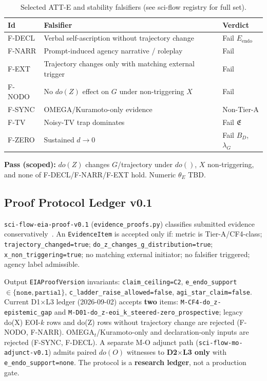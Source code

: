 \documentclass[11pt,a4paper]{article}
\theoremstyle{definition}
\begin{document}
\begin{table}[H]
\centering\small
\begin{tabular}{llp{5.5cm}}
\toprule Id & Falsifier & Verdict \\ \midrule
F-DECL & Verbal self-ascription without trajectory change & Fail $E_{\mathrm{endo}}$ \\
F-NARR & Prompt-induced agency narrative / roleplay & Fail \\
F-EXT & Trajectory changes only with matching external trigger & Fail \\
F-NODO & No $do(Z)$ effect on $G$ under non-triggering $X$ & Fail \\
F-SYNC & OMEGA/Kuramoto-only evidence & Non-Tier-A \\
F-TV & Noisy-TV trap dominates & Fail $\mathfrak{E}$ \\
F-ZERO & Sustained $d\to 0$ & Fail $B_D$, $\lambda_G$ \\ \bottomrule
\end{tabular}
\caption{Selected ATT-E and stability falsifiers (see sci-flow registry for full set).}
\end{table}

\textbf{Pass (scoped):} $do(Z)$ changes $G$/trajectory under $do()$, $X$ non-triggering, and none of F-DECL/F-NARR/F-EXT hold. Numeric $\theta_E$ TBD.

\subsection{Proof Protocol Ledger v0.1}
\texttt{sci-flow-eia-proof-v0.1} (\texttt{evidence\_proofs.py}) classifies submitted evidence conservatively~\cite{kuznetsov2026proof}. An \texttt{EvidenceItem} is accepted only if: metric is Tier-A/CF4-class; \texttt{trajectory\_changed=true}; \texttt{do\_z\_changes\_g\_distribution=true}; \texttt{x\_non\_triggering=true}; no matching external initiator; no falsifier triggered; agency label admissible.

Output \texttt{EIAProofVersion} invariants: \texttt{claim\_ceiling=C2}, \texttt{e\_endo\_support}$\in\{\texttt{none},\texttt{partial}\}$, \texttt{c\_ladder\_raise\_allowed=false}, \texttt{agi\_star\_claim=false}. Current D1$\times$L3 ledger (2026-09-02) accepts \textbf{two} items: \texttt{M-CF4-do\_z-epistemic\_gap} and \texttt{M-D01-do\_z-eoi\_k\_steered-zero\_prospective}; legacy do(X) EOI-$k$ rows and do(Z) rows without trajectory change are rejected (F-NODO, F-NARR). OMEGA$_t$/Kuramoto-only and declaration-only inputs are rejected (F-SYNC, F-DECL). A separate M-O adjunct path (\texttt{sci-flow-mo-adjunct-v0.1}) admits paired $do(O)$ witnesses to \textbf{D2$\times$L3 only} with \texttt{e\_endo\_support=none}. The protocol is a \textbf{research ledger}, not a production gate.
\end{document}
